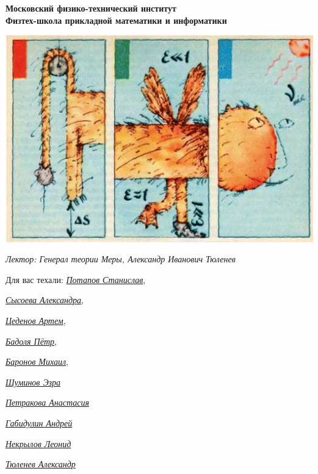 \begin{titlepage}
	\clearpage\thispagestyle{empty}
	\centering
	
	\textbf{Московский физико-технический институт \\ Физтех-школа прикладной математики и информатики}
	\vspace{50pt}
    
    \noindent 
    \includegraphics[width=1.0\textwidth]{Pictures/title}
    \vspace{10pt}

 
 
     \textit{\large{Лектор: Генерал теории Меры, Александр Иванович Тюленев}
} 

	\vfill
	\begin{flushright}
    \noindent
    Для вас техали: \href{https://vk.com/invader17}{\textit{Потапов Станислав}}, 
  
    \href{https://vk.com/salexame}{\textit{ Сысоева Александра}}, 
    
    \href{https://vk.com/darkness11235}{\textit{ Цеденов Артем}},  
    
    \href{https://vk.com/akzium}{\textit{Бадоля Пётр}},
    
    \href{https://vk.com/id389655743}{\textit{Баронов Михаил}},

    \href{https://t.me/YamSuf}{\textit{Шуминов Эзра}}
    
    \href{https://vk.com/prizrakkota}{\textit{Петракова Анастасия}}
    
    \href{https://t.me/andreygabi}{\textit{Габидулин Андрей}}
    
    \href{https://t.me/leonid_n_n}{\textit{Некрылов Леонид}}
    
    \href{https://t.me/alexander_math_123}{\textit{Тюленев Александр}}

    
  
	\end{flushright}


	\pagebreak
\end{titlepage}